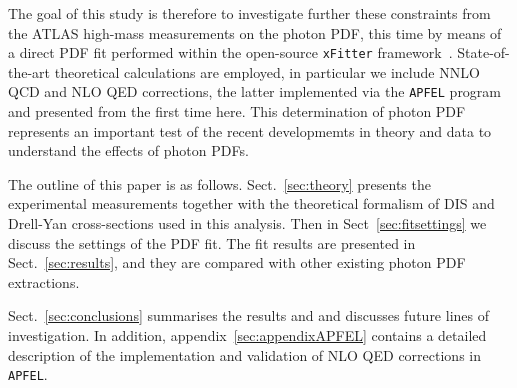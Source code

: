 The goal of this study is therefore to investigate further these constraints
from the ATLAS high-mass measurements on the photon PDF,
this time by means of a direct PDF fit performed within the
open-source {\tt xFitter} framework~\cite{Alekhin:2014irh}.
%
State-of-the-art theoretical calculations are employed,
in particular
we include NNLO QCD and NLO QED corrections, the latter implemented
via the {\tt APFEL} program and presented from the first time
here.
%
This determination of photon PDF represents an important test
 of the recent developmemts in theory and data to understand the effects of photon PDFs.


The outline of this paper is as follows.
%
Sect.~\ref{sec:theory} presents the experimental measurements together with the theoretical formalism
of DIS and Drell-Yan cross-sections used in this analysis.
%
Then in Sect~\ref{sec:fitsettings} we discuss the settings of
the PDF fit.
%
%
The fit results are presented in Sect.~\ref{sec:results},
and they are compared with other existing photon PDF extractions.

%
Sect.~\ref{sec:conclusions} summarises the results and 
and discusses future lines of investigation.
%
In addition, appendix~\ref{sec:appendixAPFEL} contains a detailed description of
the implementation and validation of NLO QED corrections
in {\tt APFEL}.
